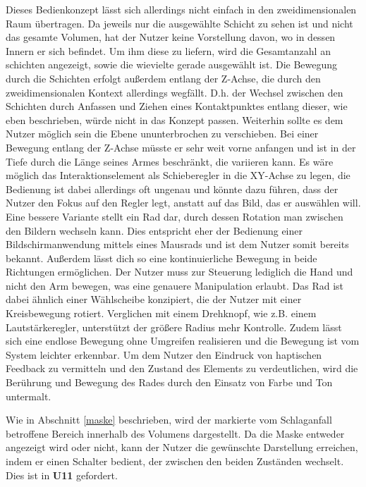 Dieses Bedienkonzept lässt sich allerdings nicht einfach in den zweidimensionalen Raum übertragen. Da jeweils nur die ausgewählte Schicht zu sehen ist und nicht das gesamte Volumen, hat der Nutzer keine Vorstellung davon, wo in dessen Innern er sich befindet. Um ihm diese zu liefern, wird die Gesamtanzahl an schichten angezeigt, sowie die wievielte gerade ausgewählt ist. 
Die Bewegung durch die Schichten erfolgt außerdem entlang der Z-Achse, die durch den zweidimensionalen Kontext allerdings wegfällt. D.h. der Wechsel zwischen den Schichten durch Anfassen und Ziehen eines Kontaktpunktes entlang dieser, wie eben beschrieben, würde nicht in das Konzept passen. 
Weiterhin sollte es dem Nutzer möglich sein die Ebene ununterbrochen zu verschieben. Bei einer Bewegung entlang der Z-Achse müsste er sehr weit vorne anfangen und ist in der Tiefe durch die Länge seines Armes beschränkt, die  variieren kann. Es wäre möglich das Interaktionselement als Schieberegler in die XY-Achse zu legen, die Bedienung ist dabei allerdings oft ungenau und könnte dazu führen, dass der Nutzer den Fokus auf den Regler legt, anstatt auf das Bild, das er auswählen will. Eine bessere Variante stellt ein Rad dar, durch dessen Rotation man zwischen den Bildern wechseln kann. Dies entspricht eher der Bedienung einer Bildschirmanwendung mittels eines Mausrads und ist dem Nutzer somit bereits bekannt. Außerdem lässt dich so eine kontinuierliche Bewegung in beide Richtungen ermöglichen. Der Nutzer muss zur Steuerung lediglich die Hand und nicht den Arm bewegen, was eine genauere Manipulation erlaubt. 
Das Rad ist dabei ähnlich einer Wählscheibe konzipiert, die der Nutzer mit einer Kreisbewegung rotiert. Verglichen mit einem Drehknopf, wie z.B. einem Lautstärkeregler, unterstützt der größere Radius mehr Kontrolle. Zudem lässt sich eine endlose Bewegung ohne Umgreifen realisieren und die Bewegung ist vom System leichter erkennbar. 
Um dem Nutzer den Eindruck von haptischen Feedback zu vermitteln und den Zustand des Elements zu verdeutlichen, wird die Berührung und Bewegung des Rades durch den Einsatz von Farbe und Ton untermalt.


Wie in Abschnitt \ref{maske} beschrieben, wird der markierte vom Schlaganfall betroffene Bereich innerhalb des Volumens dargestellt. Da die Maske entweder angezeigt wird oder nicht, kann der Nutzer die gewünschte Darstellung erreichen, indem er einen Schalter bedient, der zwischen den beiden Zuständen wechselt. Dies ist in \textbf{U11} gefordert.

